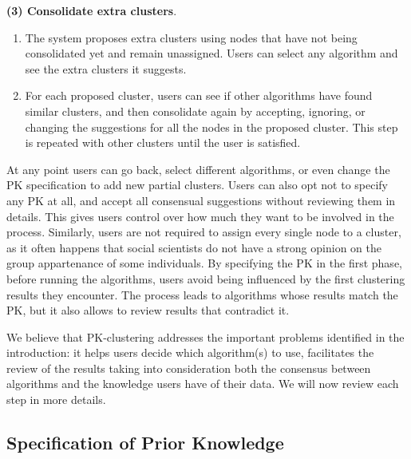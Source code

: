 \noindent \textbf{(3) Consolidate extra clusters}.
\begin{enumerate}[left=.3em,nosep,label={\arabic*}.,start=7,itemindent=0pt]
\item The system proposes extra clusters using nodes that have not being consolidated yet and remain unassigned. Users can select any algorithm and see the extra clusters it suggests.
\item For each proposed cluster, users can see if other algorithms have found similar clusters, and then consolidate again by accepting, ignoring, or changing the suggestions for all the nodes in the proposed cluster. This step is repeated with other clusters until the user is satisfied.
\end{enumerate}

At any point users can go back, select different algorithms, or even change the PK specification to add new partial clusters.  Users can also opt not to specify any PK at all, and accept all consensual suggestions without reviewing them in details. This gives users control over how much they want to be involved in the process. Similarly, users are not required to assign every single node to a cluster, as it often happens that social scientists do not have a strong opinion on the group appartenance of some individuals.
By specifying the PK in the first phase, before running the algorithms, users avoid being influenced by the first clustering results they encounter.  The process leads to algorithms whose results match the PK, but it also allows to review results that contradict it.


We believe that PK-clustering addresses the important problems identified in the introduction: it helps users decide which algorithm(s) to use, facilitates the review of the results taking into consideration both the consensus between algorithms and the knowledge users have of their data.
We will now review each step in more details.




\subsection{Specification of Prior Knowledge}

